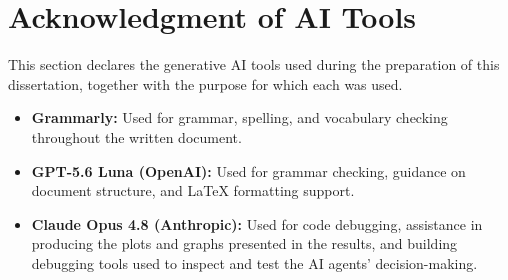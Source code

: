 \documentclass[12pt,a4paper,oneside]{report}
\begin{document}

\chapter*{Acknowledgment of AI Tools}

This section declares the generative AI tools used during the preparation of this dissertation, together with the purpose for which each was used.

\begin{itemize}
  \item \textbf{Grammarly:} Used for grammar, spelling, and vocabulary checking throughout the written document.
  \item \textbf{GPT-5.6 Luna (OpenAI):} Used for grammar checking, guidance on document structure, and LaTeX formatting support.
  \item \textbf{Claude Opus 4.8 (Anthropic):} Used for code debugging, assistance in producing the plots and graphs presented in the results, and building debugging tools used to inspect and test the AI agents' decision-making.
\end{itemize}
\end{document}
